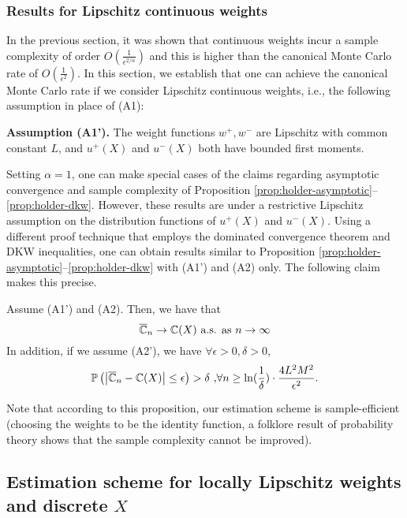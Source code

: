 \subsubsection{Results for Lipschitz continuous weights}
In the previous section, it was shown that \holder continuous weights incur a sample complexity of order $O\left(\frac1{\epsilon^{2/\alpha}}\right)$ and this is higher than the canonical Monte Carlo rate of $O\left(\frac1{\epsilon^2}\right)$. In this section, we establish that one can achieve the canonical Monte Carlo rate if we consider Lipschitz continuous weights, i.e., the following assumption in place of (A1):
 
\textbf{Assumption (A1').}  The weight functions $w^+, w^-$ are Lipschitz with common constant $L$, and 
$u^+(X)$ and $u^-(X)$ both have bounded first moments.

Setting $\alpha=1$, one can make special cases of the claims regarding asymptotic convergence and sample complexity of Proposition \ref{prop:holder-asymptotic}--\ref{prop:holder-dkw}. However, these results are under  a restrictive Lipschitz assumption on the distribution functions of $u^+(X)$ and $u^-(X)$. Using a different proof technique that employs the dominated convergence theorem and DKW inequalities, one can obtain results similar to Proposition \ref{prop:holder-asymptotic}--\ref{prop:holder-dkw} with (A1') and (A2) only. The following claim makes this precise.

\begin{proposition}
\label{prop:lipschitz}
Assume (A1') and (A2). Then, we have that 
$$\overline {\mathbb{C}}_n
\rightarrow
\mathbb{C}(X)
 \text{   a.s. as } n\rightarrow \infty
$$
In addition, if we assume (A2'), we have $\forall \epsilon >0, \delta >0$, 
$$
\mathbb{P}\left( \left |\overline {\mathbb{C}}_n- \mathbb{C}(X) \right| \leq  \epsilon  \right) > \delta\text{     ,} \forall n \geq \ln(\frac{1}{\delta})\cdot 
\frac{4L^2 M^2}{\epsilon^{2}}.
$$
\end{proposition}
Note that according to this proposition, our estimation scheme is sample-efficient (choosing the weights to be the identity function, a folklore result of probability theory shows that the sample complexity cannot be improved).

\subsection{Estimation scheme for locally Lipschitz weights and discrete $X$}

